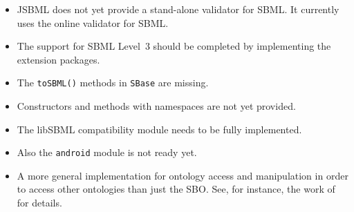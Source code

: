 \begin{itemize}
\item JSBML does not yet provide a stand-alone validator for SBML. It currently
uses the online validator for SBML.
\item The support for SBML Level~3 should be completed by
implementing the extension packages.
\item The \texttt{toSBML()}
methods in \texttt{SBase} are missing.
\item Constructors and methods with namespaces are not yet provided.
\item The libSBML compatibility module
needs to be fully implemented.
\item Also the \texttt{android} module is not ready yet.
\item A more general implementation for ontology access and manipulation in
order to access other ontologies than just the SBO. See, for instance, the work
of \citet{Courtot2011a} for details.
\end{itemize}

